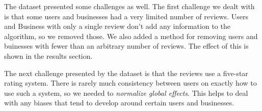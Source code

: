 The dataset presented some challenges as well. The first challenge we dealt with
is that some users and businesses had a very limited number of reviews. Users
and Business with only a single review don't add any information to the
algorithm, so we removed those. We also added a method for removing users and
buinesses with fewer than an arbitrary number of reviews. The effect of this is
shown in the results section.

The next challenge presented by the dataset is that the reviews use a five-star
rating system. There is rarely much consistency between users on exactly how to
use such a system, so we needed to \emph{normalize global effects}. This helps
to deal with any biases that tend to develop around certain users and
businesses. 
